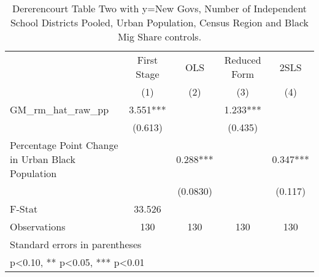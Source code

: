 \begin{table}[htbp]\centering
\def\sym#1{\ifmmode^{#1}\else\(^{#1}\)\fi}
\caption{Dererencourt Table Two with y=New Govs, Number of Independent School Districts Pooled, Urban Population, Census Region and Black Mig Share controls.}
\begin{tabular}{l*{4}{c}}
\toprule
                    & First Stage   &         OLS   &Reduced Form   &        2SLS   \\
                    &\multicolumn{1}{c}{(1)}   &\multicolumn{1}{c}{(2)}   &\multicolumn{1}{c}{(3)}   &\multicolumn{1}{c}{(4)}   \\
\midrule
GM\_rm\_hat\_raw\_pp    &       3.551***&               &       1.233***&               \\
                    &     (0.613)   &               &     (0.435)   &               \\
\addlinespace
Percentage Point Change in Urban Black Population&               &       0.288***&               &       0.347***\\
                    &               &    (0.0830)   &               &     (0.117)   \\
\midrule
F-Stat              &      33.526   &               &               &               \\
Observations        &         130   &         130   &         130   &         130   \\
\bottomrule
\multicolumn{5}{l}{\footnotesize Standard errors in parentheses}\\
\multicolumn{5}{l}{\footnotesize * p<0.10, ** p<0.05, *** p<0.01}\\
\end{tabular}
\end{table}
